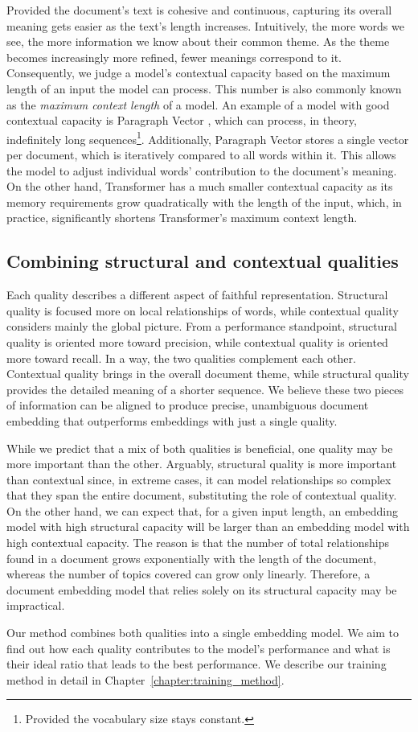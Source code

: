 Provided the document's text is cohesive and continuous, capturing its overall
meaning gets easier as the text's length increases. Intuitively, the more words
we see, the more information we know about their common theme. As the theme
becomes increasingly more refined, fewer meanings correspond to it.
Consequently, we judge a model's contextual capacity based on the maximum
length of an input the model can process. This number is also commonly
known as the \emph{maximum context length} of a model. An example of a model with good
contextual capacity is Paragraph Vector \citep{le2014distributed}, which can
process, in theory, indefinitely long sequences\footnote{Provided the
vocabulary size stays constant.}. Additionally, Paragraph Vector stores a
single vector per document, which is iteratively compared to all words within
it. This allows the model to adjust individual words' contribution to the
document's meaning. On the other hand, Transformer \citep{vaswani2017attention}
has a much smaller contextual capacity as its memory requirements grow
quadratically with the length of the input, which, in practice, significantly
shortens Transformer's maximum context length.

\subsection{Combining structural and contextual
qualities}\label{section:combine_structural_and_contextual}

Each quality describes a different aspect of faithful representation.
Structural quality is focused more on local relationships of words, while
contextual quality considers mainly the global picture. From a performance
standpoint, structural quality is oriented more toward precision, while
contextual quality is oriented more toward recall. In a way, the two qualities
complement each other. Contextual quality brings in the overall document theme,
while structural quality provides the detailed meaning of a shorter sequence.
We believe these two pieces of information can be aligned to produce
precise, unambiguous document embedding that outperforms embeddings
with just a single quality.

While we predict that a mix of both qualities is beneficial, one quality may be more important than the other. Arguably, structural quality is more
important than contextual since, in extreme cases, it can model relationships
so complex that they span the entire document, substituting the role of contextual
quality. On the other hand, we can expect that, for a given input
length, an embedding model with high structural capacity will be larger than an
embedding model with high contextual capacity. The reason is that the number of
total relationships found in a document grows exponentially with the length of
the document, whereas the number of topics covered can grow only linearly. Therefore, a document embedding model that relies solely on its structural capacity may be impractical.

Our method combines both qualities into a single embedding model. We aim to find out how each quality contributes to the model's performance and what is their ideal ratio that leads to the best performance. We describe our training method in detail in Chapter~\ref{chapter:training_method}.
